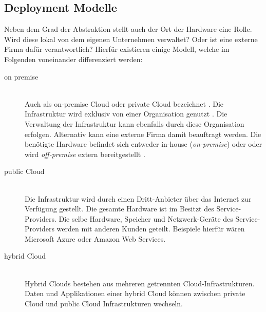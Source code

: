 \subsection{Deployment Modelle}
Neben dem Grad der Abstraktion stellt auch der Ort der Hardware eine Rolle. Wird diese lokal von dem eigenen Unternehmen verwaltet? Oder ist eine externe Firma dafür verantwortlich? Hierfür existieren einige Modell, welche im Folgenden voneinander differenziert werden:
\begin{description}
    \item [on premise] \hfill \\ Auch als on-premise Cloud oder private Cloud bezeichnet \cite{dimpi_rani_rajiv_kumar_ranjan_comparative_2014}. Die Infrastruktur wird exklusiv von einer Organisation genutzt \cite{mell_nist_2011}. Die Verwaltung der Infrastruktur kann ebenfalls durch diese Organisation erfolgen. Alternativ kann eine externe Firma damit beauftragt werden. Die benötigte Hardware befindet sich entweder in-house (\textit{on-premise}) oder oder wird \textit{off-premise} extern bereitgestellt \cite{zwicker_saas_nodate}.
    \item [public Cloud] \hfill \\ Die Infrastruktur wird durch einen Dritt-Anbieter über das Internet zur Verfügung gestellt. Die gesamte Hardware ist im Besitzt des Service-Providers. Die selbe Hardware, Speicher und Netzwerk-Geräte des Service-Providers werden mit anderen Kunden geteilt. Beispiele hierfür wären Microsoft Azure oder Amazon Web Services. \cite{microsoft_public_nodate} \cite{mell_nist_2011}
    \item [hybrid Cloud] \hfill \\ Hybrid Clouds bestehen aus mehreren getrennten Cloud-Infrastrukturen. Daten und Applikationen einer hybrid Cloud können zwischen private Cloud und public Cloud Infrastrukturen wechseln. \cite{mell_nist_2011}
\end{description}

